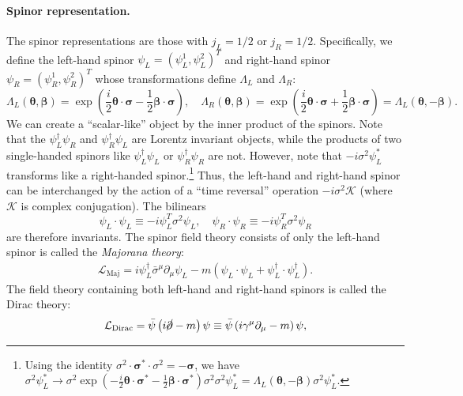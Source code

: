 \documentclass[aps,prb,superscriptaddress,nofootinbib]{revtex4}
\begin{document}
\paragraph*{Spinor representation.}
The spinor representations are those with $j_L=1/2$ or $j_R=1/2$. 
Specifically, we define the left-hand spinor $\psi_L = (\psi_L^1, \psi_L^2)^T$ and right-hand spinor $\psi_R = (\psi_R^1, \psi_R^2)^T$ whose transformations define $\Lambda_L$ and $\Lambda_R$:
\begin{equation}\label{eq:qft-left-right-spinor-rep}
	\Lambda_L(\bm\theta,\bm\beta) = \exp\left(\frac{i}{2}\bm\theta\cdot\bm\sigma-\frac{1}{2}\bm\beta\cdot\bm\sigma \right), \quad
	\Lambda_R(\bm\theta,\bm\beta) = \exp\left(\frac{i}{2}\bm\theta\cdot\bm\sigma+\frac{1}{2}\bm\beta\cdot\bm\sigma \right) = \Lambda_L(\bm \theta, -\bm \beta).
\end{equation}
We can create a ``scalar-like'' object by the inner product of the spinors.
Note that the $\psi_L^\dagger \psi_R$ and $\psi_R^\dagger \psi_L$ are Lorentz invariant objects, while the products of two single-handed spinors like $\psi_L^\dagger \psi_L$ or $\psi_R^\dagger \psi_R$ are not.
However, note that $-i\sigma^2 \psi_L^*$ transforms like a right-handed spinor.\footnote{Using the identity $\sigma^2 \cdot \bm\sigma^* \cdot\sigma^2 = -\bm\sigma$, we have $\sigma^2 \psi_L^*
	\rightarrow \sigma^2 \exp\left(-\frac{i}{2}\bm\theta\cdot\bm\sigma^*-\frac{1}{2}\bm\beta\cdot\bm\sigma^* \right) \sigma^2 \sigma^2 \psi_L^* 
	= \Lambda_L(\bm \theta, -\bm\beta) \sigma^2 \psi_L^*$.}
Thus, the left-hand and right-hand spinor can be interchanged by the action of a ``time reversal'' operation $-i\sigma^2 \mathcal K$ (where $\mathcal K$ is complex conjugation).
The bilinears
\begin{equation*}
	\psi_L \cdot \psi_L \equiv -i\psi_L^T \sigma^2 \psi_L,\quad
	\psi_R \cdot \psi_R \equiv -i\psi_R^T \sigma^2 \psi_R
\end{equation*}
are therefore invariants.
The spinor field theory consists of only the left-hand spinor is called the \textit{Majorana theory}:
\begin{equation}
\begin{aligned}
	\mathcal{L}_{\mathrm{Maj}}
	= i \psi_L^\dagger \bar\sigma^\mu \partial_\mu  \psi_L -m(\psi_L \cdot \psi_L + \psi_L^\dagger \cdot \psi_L^\dagger).
\end{aligned}
\end{equation}
The field theory containing both left-hand and right-hand spinors is called the Dirac theory:
\begin{equation}
	\mathcal{L}_{\mathrm{Dirac}} = \bar\psi \left(i\cancel\partial - m\right)\psi
	\equiv \bar\psi \left(i\gamma^\mu \partial_\mu - m\right)\psi,
\end{equation}
\end{document}
